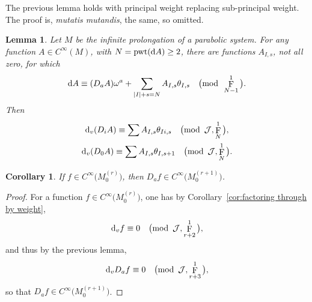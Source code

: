 \documentclass[pdftex]{sigma}
\renewcommand{\d}{{\rm d}}
\newcommand{\cinfinity}[1]{C^\infty\big(#1\big)}
\renewcommand{\mod}[1]{\quad\big(\mathrm{mod\enspace} #1\big)}
\newcommand{\M}[1]{M_0^{(#1)}}
\newcommand{\thetas}[1]{\theta_{#1}}
\DeclareMathOperator{\pwf}{F}
\DeclareMathOperator{\pwt}{\mathrm{pwt}}
\newcommand{\dv}{\ensuremath{\hspace{1pt} \d_v}}
\newcommand{\cartTheta}{\mathcal{J}}
\newcommand{\cMinfty}{C^\infty(M)}
\numberwithin{equation}{section}
\newtheorem{Corollary}[Theorem]{Corollary}
\newtheorem{Lemma}[Theorem]{Lemma}
\begin{document}
The previous lemma holds with principal weight replacing sub-principal weight. The proof is, \textit{mutatis mutandis}, the same, so omitted.
\begin{Lemma}%
 Let $M$ be the infinite prolongation of a parabolic system. For any function $A \in \cMinfty$, with $N = \pwt(\d A) \ge 2$, there are functions $A_{I,s}$, not all zero, for which
 \begin{gather*}
 \d A \equiv (D_aA)\omega^a + \sum_{|I|+s = N} A_{I,s}\thetas{I,s} \mod{\pwf^1_{N-1}} .
 \end{gather*}
 Then
 \begin{gather*}
 \dv(D_i A) \equiv \sum A_{I,s}\thetas{Ii,s} \mod{\cartTheta, \pwf^1_N} ,
 \\
 \dv(D_0 A) \equiv \sum A_{I,s}\thetas{I,s+1} \mod{\cartTheta, \pwf^1_N} .
 \end{gather*}
\end{Lemma}

\begin{Corollary}
 If $f \in \cinfinity{\M{r}}$, then $D_af \in \cinfinity{\M{r+1}}$.
\end{Corollary}
\begin{proof}
 For a function $f \in \cinfinity{\M{r}}$, one has by Corollary~\ref{cor:factoring through by weight},
 \begin{gather*}
 \dv f \equiv 0 \mod{\cartTheta, \pwf^1_{r+2}} ,
 \end{gather*}
 and thus by the previous lemma,
 \begin{gather*}
 \dv D_a f \equiv 0 \mod{\cartTheta, \pwf^1_{r+3}} ,
 \end{gather*}
 so that $D_a f \in \cinfinity{\M{r+1}}$.
\end{proof}
\end{document}

